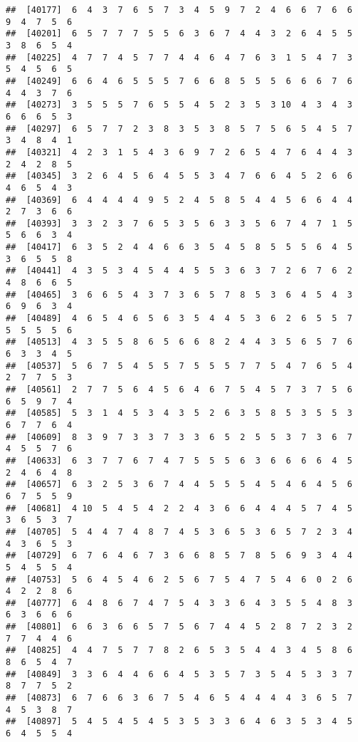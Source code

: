 \documentclass[
]{book}
\begin{document}
\begin{verbatim}
##  [40177]  6  4  3  7  6  5  7  3  4  5  9  7  2  4  6  6  7  6  6  9  4  7  5  6
##  [40201]  6  5  7  7  7  5  5  6  3  6  7  4  4  3  2  6  4  5  5  3  8  6  5  4
##  [40225]  4  7  7  4  5  7  7  4  4  6  4  7  6  3  1  5  4  7  3  5  4  5  6  5
##  [40249]  6  6  4  6  5  5  5  7  6  6  8  5  5  5  6  6  6  7  6  4  4  3  7  6
##  [40273]  3  5  5  5  7  6  5  5  4  5  2  3  5  3 10  4  3  4  3  6  6  6  5  3
##  [40297]  6  5  7  7  2  3  8  3  5  3  8  5  7  5  6  5  4  5  7  3  4  8  4  1
##  [40321]  4  2  3  1  5  4  3  6  9  7  2  6  5  4  7  6  4  4  3  2  4  2  8  5
##  [40345]  3  2  6  4  5  6  4  5  5  3  4  7  6  6  4  5  2  6  6  4  6  5  4  3
##  [40369]  6  4  4  4  4  9  5  2  4  5  8  5  4  4  5  6  6  4  4  2  7  3  6  6
##  [40393]  3  3  2  3  7  6  5  3  5  6  3  3  5  6  7  4  7  1  5  5  6  6  3  4
##  [40417]  6  3  5  2  4  4  6  6  3  5  4  5  8  5  5  5  6  4  5  3  6  5  5  8
##  [40441]  4  3  5  3  4  5  4  4  5  5  3  6  3  7  2  6  7  6  2  4  8  6  6  5
##  [40465]  3  6  6  5  4  3  7  3  6  5  7  8  5  3  6  4  5  4  3  6  9  6  3  4
##  [40489]  4  6  5  4  6  5  6  3  5  4  4  5  3  6  2  6  5  5  7  5  5  5  5  6
##  [40513]  4  3  5  5  8  6  5  6  6  8  2  4  4  3  5  6  5  7  6  6  3  3  4  5
##  [40537]  5  6  7  5  4  5  5  7  5  5  5  7  7  5  4  7  6  5  4  2  7  7  5  3
##  [40561]  2  7  7  5  6  4  5  6  4  6  7  5  4  5  7  3  7  5  6  6  5  9  7  4
##  [40585]  5  3  1  4  5  3  4  3  5  2  6  3  5  8  5  3  5  5  3  6  7  7  6  4
##  [40609]  8  3  9  7  3  3  7  3  3  6  5  2  5  5  3  7  3  6  7  4  5  5  7  6
##  [40633]  6  3  7  7  6  7  4  7  5  5  5  6  3  6  6  6  6  4  5  2  4  6  4  8
##  [40657]  6  3  2  5  3  6  7  4  4  5  5  5  4  5  4  6  4  5  6  6  7  5  5  9
##  [40681]  4 10  5  4  5  4  2  2  4  3  6  6  4  4  4  5  7  4  5  3  6  5  3  7
##  [40705]  5  4  4  7  4  8  7  4  5  3  6  5  3  6  5  7  2  3  4  4  3  6  5  3
##  [40729]  6  7  6  4  6  7  3  6  6  8  5  7  8  5  6  9  3  4  4  5  4  5  5  4
##  [40753]  5  6  4  5  4  6  2  5  6  7  5  4  7  5  4  6  0  2  6  4  2  2  8  6
##  [40777]  6  4  8  6  7  4  7  5  4  3  3  6  4  3  5  5  4  8  3  6  3  6  6  6
##  [40801]  6  6  3  6  6  5  7  5  6  7  4  4  5  2  8  7  2  3  2  7  7  4  4  6
##  [40825]  4  4  7  5  7  7  8  2  6  5  3  5  4  4  3  4  5  8  6  8  6  5  4  7
##  [40849]  3  3  6  4  4  6  6  4  5  3  5  7  3  5  4  5  3  3  7  8  7  7  5  2
##  [40873]  6  7  6  6  3  6  7  5  4  6  5  4  4  4  4  3  6  5  7  4  5  3  8  7
##  [40897]  5  4  5  4  5  4  5  3  5  3  3  6  4  6  3  5  3  4  5  6  4  5  5  4

\end{verbatim}
\end{document}
